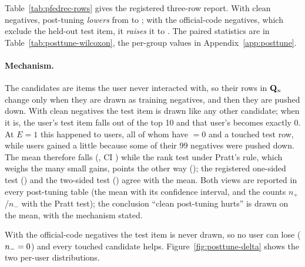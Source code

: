 Table~\ref{tab:pfedrec-rows} gives the registered three-row report. With clean negatives,
post-tuning \emph{lowers} \ndcg{} from \NdcgPfedrec{} to \NdcgEOneClean; with the official-code
negatives, which exclude the held-out test item, it \emph{raises} it to \NdcgEOneLeaky. The
paired statistics are in Table~\ref{tab:posttune-wilcoxon}, the per-group values in
Appendix~\ref{app:posttune}.

\begin{table}[htbp]
  \caption{Paired Wilcoxon tests of each post-tuning cell against the shared-table reference
  (\DsUsers{} users). $p$ one-sided tests the registered hypothesis ``cell $>$ reference'' with
  zero differences discarded; $p$ Pratt keeps them. Rows marked W$^-$=0 have no user whose score
  decreased, so their $p$-values follow from the construction (Section~\ref{sec:method-posttune})
  and the evidence is the confidence interval.}
  \label{tab:posttune-wilcoxon}
  \centering\scriptsize
  \fittable{}
\end{table}

\paragraph{Mechanism.} The candidates are items the user never interacted with, so their rows
in $\mathbf{Q}_u$ change only when they are drawn as training negatives, and then they are pushed down.
With clean negatives the test item is drawn like any other candidate; when it is, the user's
test item falls out of the top 10 and that user's \ndcg{} becomes exactly $0$. At $E=1$ this
happened to \PtZeroLosersEOneClean{} users, all of whom have \ndcg{} $=0$ and a touched test
row, while \PtNPosEOneClean{} users gained a little because some of their 99 negatives were
pushed down. The mean therefore falls (\PtDeltaEOneClean, CI \PtCiEOneClean) while the rank
test under Pratt's rule, which weighs the many small gains, points the other way
(\PtPPrattEOneClean); the registered one-sided test (\PtPOneEOneClean) and the two-sided test
(\PtPTwoEOneClean) agree with the mean. Both views are reported in every post-tuning table (the mean with its confidence interval,
and the counts $n_+$/$n_-$ with the Pratt test); the conclusion ``clean post-tuning hurts'' is
drawn on the mean, with the mechanism stated.

With the official-code negatives the test item is never drawn, so no user can lose
($n_-=0$) and every touched candidate helps. Figure~\ref{fig:posttune-delta}
shows the two per-user distributions.

